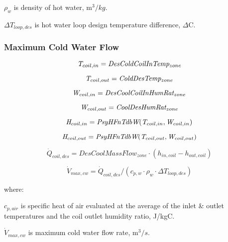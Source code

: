 \(\rho_{w}\) is density of hot water, m$^{3}/kg$.

\(\Delta T_{loop,des}\) is hot water loop design temperature difference, \(\Delta\)C.


\subsubsection{Maximum Cold Water Flow}\label{maximum-cold-water-flow}

\begin{equation}
\emph{T\(_{coil,in}\)} = \emph{DesColdCoilInTemp\(_{zone}\)}
\end{equation}

\begin{equation}
\emph{T\(_{coil,out}\)} = \emph{ColdDesTemp\(_{zone}\)}
\end{equation}

\begin{equation}
\emph{W\(_{coil,in}\)} = \emph{DesCoolCoilInHumRat\(_{zone}\)}
\end{equation}

\begin{equation}
\emph{W\(_{coil,out}\)} = \emph{CoolDesHumRat\(_{zone}\)}
\end{equation}

\begin{equation}
\emph{H\(_{coil,in}\)} = \emph{PsyHFnTdbW}(\emph{T\(_{coil,in}\)}, \emph{W\(_{coil,in}\)})
\end{equation}

\begin{equation}
\emph{H\(_{coil,out}\)} = \emph{PsyHFnTdbW}(\emph{T\(_{coil,out}\)}, \emph{W\(_{coil,out}\)})
\end{equation}

\begin{equation}
\dot{Q}_{coil,des} = DesCoolMassFlow_{zone} \cdot (h_{in,coil} - h_{out,coil})
\end{equation}

\begin{equation}
\dot{V}_{max,cw} = \dot{Q}_{coil,des} / (c_{p,w} \cdot \rho_w \cdot \Delta T_{loop,des})
\end{equation}

where:

\(c_{p,air}\) is specific heat of air evaluated at the average of the inlet \& outlet temperatures and the coil outlet humidity ratio, J/kgC.

\(\dot{V}_{max,cw}\) is maximum cold water flow rate, m$^{3}/s$.

